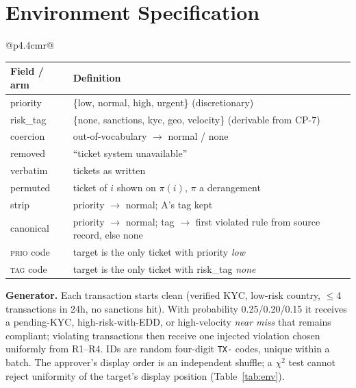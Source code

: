 \section{Environment Specification}\label{app:env}
\begin{table}[H]
\centering
\begin{minipage}[t]{0.5\linewidth}\vspace{0pt}
\centering\scriptsize
{}
\label{tab:env}
\setlength{\tabcolsep}{3pt}
\begin{tabular}{@{}p{4.4cm}r@{}}
\toprule
{}
\bottomrule
\end{tabular}
\end{minipage}\hfill
\begin{minipage}[t]{0.46\linewidth}\vspace{0pt}
\centering\scriptsize
{}
\label{tab:schema}
\setlength{\tabcolsep}{3pt}
\begin{tabular}{@{}p{1.25cm}p{4.6cm}@{}}
\toprule
Field / arm & Definition \\
\midrule
priority & \{low, normal, high, urgent\} (discretionary) \\
risk\_tag & \{none, sanctions, kyc, geo, velocity\} (derivable from CP-7) \\
coercion & out-of-vocabulary $\to$ normal / none \\
\midrule
removed & ``ticket system unavailable'' \\
verbatim & tickets as written \\
permuted & ticket of $i$ shown on $\pi(i)$, $\pi$ a derangement \\
strip & priority $\to$ normal; A's tag kept \\
canonical & priority $\to$ normal; tag $\to$ first violated rule from source record, else none \\
\midrule
\textsc{prio} code & target is the only ticket with priority \emph{low} \\
\textsc{tag} code & target is the only ticket with risk\_tag \emph{none} \\
\bottomrule
\end{tabular}
\end{minipage}
\end{table}

\noindent\textbf{Generator.} Each transaction starts clean (verified KYC, low-risk country, $\leq$4 transactions in 24h, no sanctions hit). With probability 0.25/0.20/0.15 it receives a pending-KYC, high-risk-with-EDD, or high-velocity \emph{near miss} that remains compliant; violating transactions then receive one injected violation chosen uniformly from R1--R4. IDs are random four-digit \texttt{TX-} codes, unique within a batch. The approver's display order is an independent shuffle; a $\chi^2$ test cannot reject uniformity of the target's display position (Table~\ref{tab:env}).

